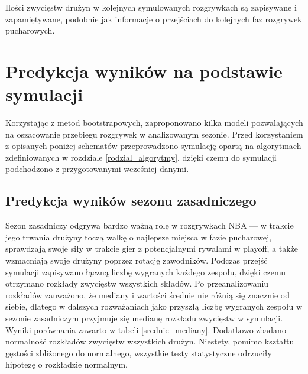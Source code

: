 \documentclass[inzynierska]{pwr_wmat_praca_dyplomowa}
\theoremstyle{plain}
\numberwithin{theorem}{chapter}
\theoremstyle{definition}
\numberwithin{theorem}{chapter}
\begin{document}
Ilości zwycięstw drużyn w kolejnych symulowanych rozgrywkach są zapisywane i zapamiętywane, podobnie jak informacje o przejściach do kolejnych faz rozgrywek pucharowych. 

\section{Predykcja wyników na podstawie symulacji}
Korzystając z metod bootstrapowych, zaproponowano kilka modeli pozwalających na oszacowanie przebiegu rozgrywek w analizowanym sezonie.
Przed korzystaniem z opisanych poniżej schematów przeprowadzono symulację opartą na algorytmach zdefiniowanych w rozdziale \ref{rodzial_algorytmy}, dzięki czemu do symulacji podchodzono z przygotowanymi wcześniej danymi.

\subsection{Predykcja wyników sezonu zasadniczego} \label{predykcja_zasadniczego}
Sezon zasadniczy odgrywa bardzo ważną rolę w rozgrywkach NBA --- w trakcie jego trwania drużyny toczą walkę o najlepsze miejsca w fazie pucharowej, sprawdzają swoje siły w trakcie gier z potencjalnymi rywalami w playoff, a także wzmacniają swoje drużyny poprzez rotację zawodników. Podczas przejść symulacji zapisywano łączną liczbę wygranych każdego zespołu, dzięki czemu otrzymano rozkłady zwycięstw wszystkich składów. Po przeanalizowaniu rozkładów zauważono, że mediany i wartości średnie nie różnią się znacznie od siebie, dlatego w dalszych rozważaniach jako przyszłą liczbę wygranych zespołu w sezonie zasadniczym przyjmuje się medianę rozkładu zwycięstw w symulacji. Wyniki porównania zawarto w tabeli \ref{srednie_mediany}. Dodatkowo zbadano normalność rozkładów zwycięstw wszystkich drużyn. Niestety, pomimo kształtu gęstości zbliżonego do normalnego, wszystkie testy statystyczne odrzuciły hipotezę o rozkładzie normalnym.
\end{document}
